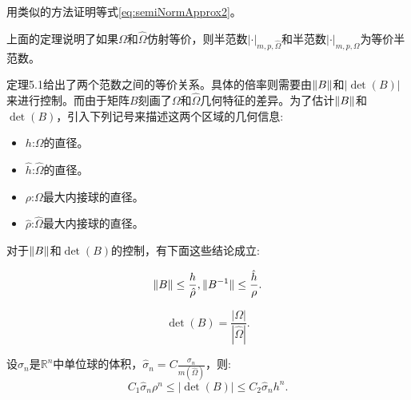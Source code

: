 \begin{exercise}
    用类似的方法证明等式\eqref{eq:semiNormApprox2}。
\end{exercise}
\begin{remark}
    上面的定理说明了如果$\Omega$和$\hat{\Omega}$仿射等价，则半范数$|\cdot|_{m,p,\hat{\Omega}}$和半范数$|\cdot|_{m,p,\Omega}$为等价半范数。
\end{remark}
定理5.1给出了两个范数之间的等价关系。具体的倍率则需要由$\|B\|$和$|\det(B)|$来进行控制。而由于矩阵$B$刻画了$\Omega$和$\hat{\Omega}$几何特征的差异。为了估计$\|B\|$和$\det(B)$，引入下列记号来描述这两个区域的几何信息:
\begin{itemize}
    \item $h$:$\Omega$的直径。
    \item $\hat{h}$:$\hat{\Omega}$的直径。
    \item $\rho$:$\Omega$最大内接球的直径。
    \item $\hat{\rho}$:$\hat{\Omega}$最大内接球的直径。
\end{itemize}
对于$\|B\|$和$\det(B)$的控制，有下面这些结论成立:
\begin{lemma}
    \begin{equation}
        \|B\|\le\frac{h}{\hat{\rho}},\|B^{-1}\|\le\frac{\hat{h}}{\rho}.
    \end{equation}
\end{lemma}
\begin{lemma}
    \begin{equation}
    \det(B)=\frac{|\Omega|}{|\hat{\Omega}|}.
    \end{equation}
\end{lemma}
\begin{lemma}
    设$\sigma_{n}$是$\mathbb{R}^{n}$中单位球的体积，$\hat{\sigma}_{n}=C\frac{\sigma_{n}}{m(\hat{\Omega})}$，则:
    \begin{equation}
        C_{1}\hat{\sigma}_{n}\rho^{n}\le|\det(B)|\le C_{2}\hat{\sigma}_{n}h^{n}.
    \end{equation}
\end{lemma}
